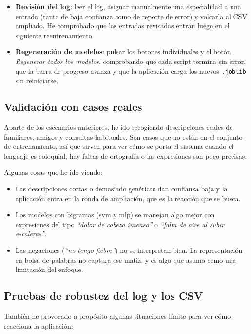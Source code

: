 \begin{itemize}
	\item \textbf{Revisión del log}: leer el log, asignar manualmente una especialidad a una entrada (tanto de baja confianza como de reporte de error) y volcarla al CSV ampliado. He comprobado que las entradas revisadas entran luego en el siguiente reentrenamiento.
	
	\item \textbf{Regeneración de modelos}: pulsar los botones individuales y el botón \textit{Regenerar todos los modelos}, comprobando que cada script termina sin error, que la barra de progreso avanza y que la aplicación carga los nuevos \texttt{.joblib} sin reiniciarse.
\end{itemize}

\subsection{Validación con casos reales}

Aparte de los escenarios anteriores, he ido recogiendo descripciones reales de familiares, amigos y consultas habituales. Son casos que no están en el conjunto de entrenamiento, así que sirven para ver cómo se porta el sistema cuando el lenguaje es coloquial, hay faltas de ortografía o las expresiones son poco precisas.

Algunas cosas que he ido viendo:

\begin{itemize}
	\item Las descripciones cortas o demasiado genéricas dan confianza baja y la aplicación entra en la ronda de ampliación, que es la reacción que se busca.
	\item Los modelos con bigramas (\gls{svm} y \gls{mlp}) se manejan algo mejor con expresiones del tipo \textit{``dolor de cabeza intenso''} o \textit{``falta de aire al subir escaleras''}.
	\item Las negaciones (\textit{``no tengo fiebre''}) no se interpretan bien. La representación en bolsa de palabras no captura ese matiz, y es algo que asumo como una limitación del enfoque.
\end{itemize}

\subsection{Pruebas de robustez del log y los CSV}

También he provocado a propósito algunas situaciones límite para ver cómo reacciona la aplicación:

